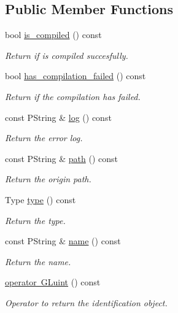 \subsection*{Public Member Functions}
\begin{DoxyCompactItemize}
\item 
bool \mbox{\hyperlink{classprz_1_1_shader_aaf76d1f8e733e2b2a92790283f396fb6}{is\+\_\+compiled}} () const
\begin{DoxyCompactList}\small\item\em Return if is compiled succesfully. \end{DoxyCompactList}\item 
bool \mbox{\hyperlink{classprz_1_1_shader_aee6376f3446bf9f163ea76d6a3a7491d}{has\+\_\+compilation\+\_\+failed}} () const
\begin{DoxyCompactList}\small\item\em Return if the compilation has failed. \end{DoxyCompactList}\item 
const P\+String \& \mbox{\hyperlink{classprz_1_1_shader_af51b4c8c6aeced5c43ab485cb484f91e}{log}} () const
\begin{DoxyCompactList}\small\item\em Return the error log. \end{DoxyCompactList}\item 
const P\+String \& \mbox{\hyperlink{classprz_1_1_shader_a16e80489a6a0ad68daa3524eb844f1e2}{path}} () const
\begin{DoxyCompactList}\small\item\em Return the origin path. \end{DoxyCompactList}\item 
Type \mbox{\hyperlink{classprz_1_1_shader_a2bfab69158c791e4a34942abd593c889}{type}} () const
\begin{DoxyCompactList}\small\item\em Return the type. \end{DoxyCompactList}\item 
const P\+String \& \mbox{\hyperlink{classprz_1_1_shader_a2ba459fe4dc556e94ab73df91d2c0a4e}{name}} () const
\begin{DoxyCompactList}\small\item\em Return the name. \end{DoxyCompactList}\item 
\mbox{\hyperlink{classprz_1_1_shader_ad9ff32ee5cd648fc9e4a2c554a754c0c}{operator G\+Luint}} () const
\begin{DoxyCompactList}\small\item\em Operator to return the identification object. \end{DoxyCompactList}\end{DoxyCompactItemize}
